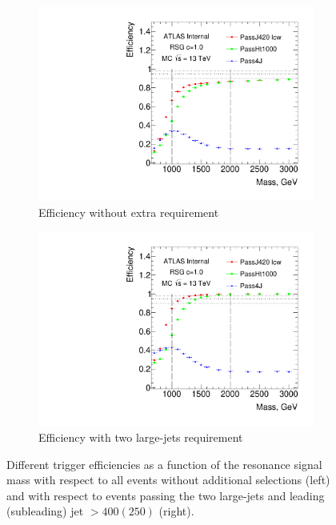 \begin{figure}[htbp!]
\centering
\captionsetup{justification=centering}
    \begin{subfigure}[b]{0.45\textwidth}
        \includegraphics[width=\textwidth,angle=-90]{figures/boosted/Trigger/app_trig_b77_Efficiency_PreSel.pdf}
        \caption{Efficiency without extra requirement}
        \label{fig:boosted-trigger-HLT_Pre}
    \end{subfigure}
    \quad
    \begin{subfigure}[b]{0.45\textwidth}
        \includegraphics[width=\textwidth,angle=-90]{figures/boosted/Trigger/app_trig_b77_Efficiency_All.pdf}
        \caption{Efficiency with two large-\R jets requirement}
        \label{fig:boosted-trigger-HLT_All}
    \end{subfigure}
\caption{Different trigger efficiencies as a function of the resonance signal mass with respect to all events without additional selections (left) and with respect to events passing the two large-\R jets and leading (subleading) jet \pt $> 400 (250)$ \GeV (right).}
\label{fig:boosted-trigger-HLT}
\end{figure}

